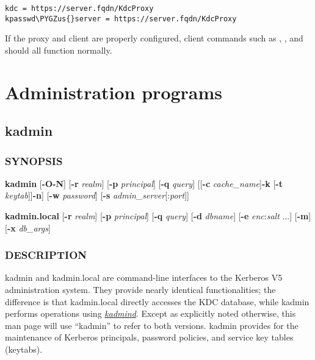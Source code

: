 \documentclass[letterpaper,10pt,english]{sphinxmanual}
\def\PYGZus{\char`\_}
\begin{document}
\begin{Verbatim}[commandchars=\\\{\}]
kdc = https://server.fqdn/KdcProxy
kpasswd\PYGZus{}server = https://server.fqdn/KdcProxy
\end{Verbatim}

If the proxy and client are properly configured, client commands such
as , , and  should all function normally.


\chapter{Administration  programs}
\label{admin/admin_commands/index:administration-programs}\label{admin/admin_commands/index::doc}

\section{kadmin}
\label{admin/admin_commands/kadmin_local::doc}\label{admin/admin_commands/kadmin_local:kadmin}\label{admin/admin_commands/kadmin_local:kadmin-1}

\subsection{SYNOPSIS}
\label{admin/admin_commands/kadmin_local:synopsis}\label{admin/admin_commands/kadmin_local:kadmin-synopsis}
\textbf{kadmin}
{[}\textbf{-O}\textbar{}\textbf{-N}{]}
{[}\textbf{-r} \emph{realm}{]}
{[}\textbf{-p} \emph{principal}{]}
{[}\textbf{-q} \emph{query}{]}
{[}{[}\textbf{-c} \emph{cache\_name}{]}\textbar{}{[}\textbf{-k} {[}\textbf{-t} \emph{keytab}{]}{]}\textbar{}\textbf{-n}{]}
{[}\textbf{-w} \emph{password}{]}
{[}\textbf{-s} \emph{admin\_server}{[}:\emph{port}{]}{]}

\textbf{kadmin.local}
{[}\textbf{-r} \emph{realm}{]}
{[}\textbf{-p} \emph{principal}{]}
{[}\textbf{-q} \emph{query}{]}
{[}\textbf{-d} \emph{dbname}{]}
{[}\textbf{-e} \emph{enc}:\emph{salt} ...{]}
{[}\textbf{-m}{]}
{[}\textbf{-x} \emph{db\_args}{]}


\subsection{DESCRIPTION}
\label{admin/admin_commands/kadmin_local:kadmin-synopsis-end}\label{admin/admin_commands/kadmin_local:description}
kadmin and kadmin.local are command-line interfaces to the Kerberos V5
administration system.  They provide nearly identical functionalities;
the difference is that kadmin.local directly accesses the KDC
database, while kadmin performs operations using {\hyperref[admin/admin_commands/kadmind:kadmind-8]{\emph{kadmind}}}.
Except as explicitly noted otherwise, this man page will use ``kadmin''
to refer to both versions.  kadmin provides for the maintenance of
Kerberos principals, password policies, and service key tables
(keytabs).
\end{document}
